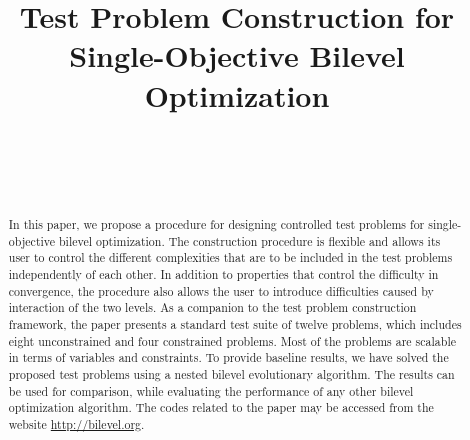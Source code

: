 \documentclass[twoside]{article}
\begin{document}
\newcommand{\boldx}{\mbox{}}
\newcommand{\boldy}{\mbox{}}
\newcommand{\boldf}{\mbox{}}
\newcommand{\boldz}{\mbox{}}
\newcommand{\boldF}{\mbox{}}
\newcommand{\boldG}{\mbox{}}
\newcommand{\boldg}{\mbox{}}
\newcommand{\boldh}{\mbox{}}
\newcommand{\boldH}{\mbox{}}
\newcommand{\boldzero}{\mbox{}}
\newcommand{\Rbb}{\mbox{}}

\newtheorem{defn}{Definition}

\title{\bf Test Problem Construction for Single-Objective Bilevel Optimization}  

\author{ \hfill {}\\ 
\AND
        \hfill {}\\
\AND
        \hfill {}\\
}

\maketitle



\begin{abstract}
In this paper, we propose a procedure for designing controlled test problems for single-objective bilevel optimization. The construction procedure is flexible and allows its user to control the different complexities that are to be included in the test problems independently of each other. In addition to properties that control the difficulty in convergence, the procedure also allows the user to introduce difficulties caused by interaction of the two levels. As a companion to the test problem construction framework, the paper presents a standard test suite of twelve problems, which includes eight unconstrained and four constrained problems. Most of the problems are scalable in terms of variables and constraints. To provide baseline results, we have solved the proposed test problems using a nested bilevel evolutionary algorithm. The results can be used for comparison, while evaluating the performance of any other bilevel optimization algorithm. The codes related to the paper may be accessed from the website \url{http://bilevel.org}.
\end{abstract}
\end{document}
